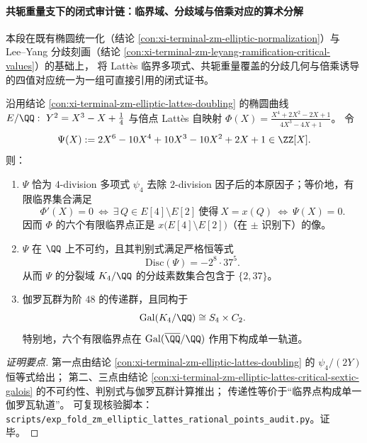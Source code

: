 \paragraph{共轭重量支下的闭式审计链：临界域、分歧域与倍乘对应的算术分解}
本段在既有椭圆统一化（结论 \ref{con:xi-terminal-zm-elliptic-normalization}）与 Lee--Yang 分歧刻画（结论 \ref{con:xi-terminal-zm-leyang-ramification-critical-values}）的基础上，
将 Latt\`es 临界多项式、共轭重量覆盖的分歧几何与倍乘诱导的四值对应统一为一组可直接引用的闭式证书。

\begin{conclusion}\label{con:xi-terminal-zm-lattes-critical-sextic-4division-splitting-field}
沿用结论 \ref{con:xi-terminal-zm-elliptic-lattes-doubling} 的椭圆曲线
\(
E/\QQ:\ Y^{2}=X^{3}-X+\tfrac14
\)
与倍点 Latt\`es 自映射
\(
\Phi(X)=\frac{X^{4}+2X^{2}-2X+1}{4X^{3}-4X+1}
\)。
令
\[
\Psi(X):=2X^{6}-10X^{4}+10X^{3}-10X^{2}+2X+1\in\ZZ[X].
\]
则：
\begin{enumerate}
  \item \(\Psi\) 恰为 \(4\)-division 多项式 \(\psi_{4}\) 去除 \(2\)-division 因子后的本原因子；等价地，有限临界集合满足
  \[
  \Phi'(X)=0
  \ \Longleftrightarrow\
  \exists\,Q\in E[4]\setminus E[2]\ \text{使得}\ X=x(Q)
  \ \Longleftrightarrow\
  \Psi(X)=0.
  \]
  因而 \(\Phi\) 的六个有限临界点正是 \(x\bigl(E[4]\setminus E[2]\bigr)\)（在 \(\pm\) 识别下）的像。
  \item \(\Psi\) 在 \(\QQ\) 上不可约，且其判别式满足严格恒等式
  \[
  \mathrm{Disc}(\Psi)=-2^{8}\cdot 37^{5}.
  \]
  从而 \(\Psi\) 的分裂域 \(K_{4}/\QQ\) 的分歧素数集合包含于 \(\{2,37\}\)。
  \item 伽罗瓦群为阶 \(48\) 的传递群，且同构于
  \[
  \mathrm{Gal}(K_{4}/\QQ)\cong S_{4}\times C_{2}.
  \]
  特别地，六个有限临界点在 \(\mathrm{Gal}(\overline{\QQ}/\QQ)\) 作用下构成单一轨道。
\end{enumerate}
\end{conclusion}
\begin{proof}[证明要点]
第一点由结论 \ref{con:xi-terminal-zm-elliptic-lattes-doubling} 的 \(\psi_{4}/(2Y)\) 恒等式给出；
第二、三点由结论 \ref{con:xi-terminal-zm-elliptic-lattes-critical-sextic-galois} 的不可约性、判别式与伽罗瓦群计算推出；
传递性等价于“临界点构成单一伽罗瓦轨道”。
可复现核验脚本：\texttt{scripts/exp\_fold\_zm\_elliptic\_lattes\_rational\_points\_audit.py}。证毕。
\end{proof}

